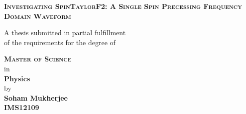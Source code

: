 \documentclass[12pt, a4wide]{report}
\begin{document}
 \setcounter{page}{1}

\begin{titlepage}
\enlargethispage{10mm}
\begin{center}
\vspace*{10mm}

\textbf{\textsc{\LARGE Investigating SpinTaylorF2: A Single Spin Precessing
Frequency Domain Waveform}}\\

\vspace*{10mm}

A thesis submitted in partial fulfillment \\ of the requirements for the
degree of \\

\vspace{5mm}

\textbf{\textsc{\Large Master of Science}}\\
in \\
{\large \bf Physics} \\
\vspace{7mm}
{{by}} \\ \vspace{2mm}
{\textbf{\large Soham Mukherjee}}\\
{\textbf{IMS12109}}\\

\vspace*{6.5mm}


\end{center}
\end{titlepage}
\end{document}
